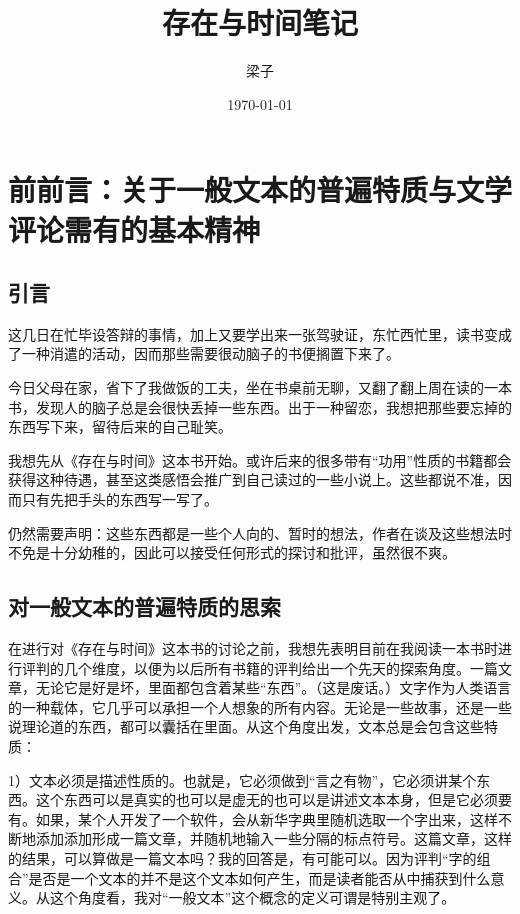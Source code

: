 \documentclass[11pt]{article}
\author{梁子}
\date{\today}
\title{存在与时间笔记}
\begin{document}
\maketitle
\tableofcontents


\section{前前言：关于一般文本的普遍特质与文学评论需有的基本精神}
\label{sec:org4c0fff5}

\subsection{引言}
\label{sec:org6a5d13e}
这几日在忙毕设答辩的事情，加上又要学出来一张驾驶证，东忙西忙里，读书变成了一种消遣的活动，因而那些需要很动脑子的书便搁置下来了。

今日父母在家，省下了我做饭的工夫，坐在书桌前无聊，又翻了翻上周在读的一本书，发现人的脑子总是会很快丢掉一些东西。出于一种留恋，我想把那些要忘掉的东西写下来，留待后来的自己耻笑。

我想先从《存在与时间》这本书开始。或许后来的很多带有“功用”性质的书籍都会获得这种待遇，甚至这类感悟会推广到自己读过的一些小说上。这些都说不准，因而只有先把手头的东西写一写了。

仍然需要声明：这些东西都是一些个人向的、暂时的想法，作者在谈及这些想法时不免是十分幼稚的，因此可以接受任何形式的探讨和批评，虽然很不爽。
\subsection{对一般文本的普遍特质的思索}
\label{sec:orgb50b801}
在进行对《存在与时间》这本书的讨论之前，我想先表明目前在我阅读一本书时进行评判的几个维度，以便为以后所有书籍的评判给出一个先天的探索角度。一篇文章，无论它是好是坏，里面都包含着某些“东西”。（这是废话。）文字作为人类语言的一种载体，它几乎可以承担一个人想象的所有内容。无论是一些故事，还是一些说理论道的东西，都可以囊括在里面。从这个角度出发，文本总是会包含这些特质：

1）文本必须是描述性质的。也就是，它必须做到“言之有物”，它必须讲某个东西。这个东西可以是真实的也可以是虚无的也可以是讲述文本本身，但是它必须要有。如果，某个人开发了一个软件，会从新华字典里随机选取一个字出来，这样不断地添加添加形成一篇文章，并随机地输入一些分隔的标点符号。这篇文章，这样的结果，可以算做是一篇文本吗？我的回答是，有可能可以。因为评判“字的组合”是否是一个文本的并不是这个文本如何产生，而是读者能否从中捕获到什么意义。从这个角度看，我对“一般文本”这个概念的定义可谓是特别主观了。
\end{document}
